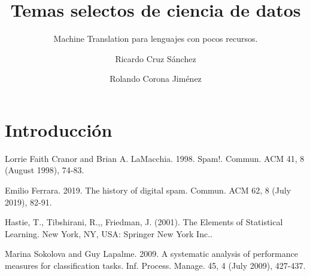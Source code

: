 \documentclass[pdf]{beamer}
\title{Temas selectos de ciencia de datos}
\subtitle{Machine Translation para lenguajes con pocos recursos.}
\author{
Ricardo Cruz Sánchez \\
  \and
Rolando Corona Jiménez
}
\institute[CIMAT]{CIMAT}
\begin{document}
\begin{frame}
\titlepage
\end{frame}




\section{Introducción}

\begin{thebibliography}{1}

Lorrie Faith Cranor and Brian A. LaMacchia. 1998. Spam!. Commun. ACM 41, 8 (August 1998), 74-83. 

Emilio Ferrara. 2019. The history of digital spam. Commun. ACM 62, 8 (July 2019), 82-91. 

Hastie, T., Tibshirani, R.,, Friedman, J. (2001). The Elements of Statistical Learning. New York, NY, USA: Springer New York Inc.. 

Marina Sokolova and Guy Lapalme. 2009. A systematic analysis of performance measures for classification tasks. Inf. Process. Manage. 45, 4 (July 2009), 427-437. 

\end{thebibliography}
\end{document}
